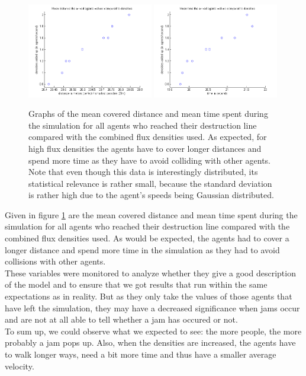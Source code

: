\begin{figure}[h!]
	\centering
		\includegraphics[width=0.49\textwidth]{pictures/AMeanDistancesCompared.png}
		\includegraphics[width=0.49\textwidth]{pictures/AMeanTimeCompared.png}
	\caption{Graphs of the mean covered distance and mean time spent during the simulation for all agents who reached their destruction line compared with the combined flux densities used. As expected, for high flux densities the agents have to cover longer distances and spend more time as they have to avoid colliding with other agents. Note that even though this data is interestingly distributed, its statistical relevance is rather small, because the standard deviation is rather high due to the agent's speeds being Gaussian distributed.}
	\label{fig:ACompared}
\end{figure}

\noi Given in figure \ref{fig:ACompared} are the mean covered distance and mean time spent during the simulation for all agents who reached their destruction line compared with the combined flux densities used. As would be expected, the agents had to cover a longer distance and spend more time in the simulation as they had to avoid collisions with other agents.\\
These variables were monitored to analyze whether they give a good description of the model and to ensure that we got results that run within the same expectations as in reality. But as they only take the values of those agents that have left the simulation, they may have a decreased significance when jams occur and are not at all able to tell whether a jam has occured or not.\\

\noi To sum up, we could observe what we expected to see: the more people, the more probably a jam pops up. Also, when the densities are increased, the agents have to walk longer ways, need a bit more time and thus have a smaller average velocity.
